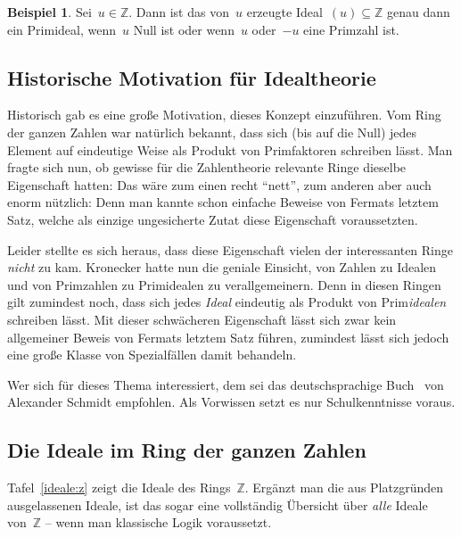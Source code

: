 \documentclass[a4paper,ngerman,12pt]{scrartcl}
\theoremstyle{definition}
\newtheorem{bsp}[defn]{Beispiel}
\theoremstyle{plain}
\theoremstyle{remark}
\newcommand{\ZZ}{\mathbb{Z}}
\renewcommand{\_}{\mathpunct{.}\,}
\newcommand{\?}{\,{:}\,}
\begin{document}
\begin{bsp}Sei~$u \in \ZZ$. Dann ist das von~$u$ erzeugte Ideal~$(u) \subseteq
\ZZ$ genau dann ein Primideal, wenn~$u$ Null ist oder wenn~$u$ oder~$-u$ eine
Primzahl ist.\end{bsp}


\subsection{Historische Motivation für Idealtheorie}

Historisch gab es eine große Motivation, dieses Konzept einzuführen. Vom Ring
der ganzen Zahlen war natürlich bekannt, dass sich (bis auf die Null) jedes
Element auf eindeutige Weise als Produkt von Primfaktoren schreiben lässt. Man
fragte sich nun, ob gewisse für die Zahlentheorie relevante Ringe dieselbe
Eigenschaft hatten: Das wäre zum einen recht "`nett"', zum anderen aber auch
enorm nützlich: Denn man kannte schon einfache Beweise von Fermats letztem
Satz, welche als einzige ungesicherte Zutat diese Eigenschaft voraussetzten.

Leider stellte es sich heraus, dass diese Eigenschaft vielen der interessanten
Ringe \emph{nicht} zu kam. Kronecker hatte nun die geniale Einsicht, von
Zahlen zu Idealen und von Primzahlen zu Primidealen zu verallgemeinern. Denn in
diesen Ringen gilt zumindest noch, dass sich jedes \emph{Ideal} eindeutig als
Produkt von Prim\emph{idealen} schreiben lässt. Mit dieser schwächeren Eigenschaft
lässt sich zwar kein allgemeiner Beweis von Fermats letztem Satz führen,
zumindest lässt sich jedoch eine große Klasse von Spezialfällen damit
behandeln.

Wer sich für dieses Thema interessiert, dem sei das deutschsprachige
Buch~\cite{schmidt:zahlentheorie} von Alexander Schmidt empfohlen. Als Vorwissen
setzt es nur Schulkenntnisse voraus.


\subsection{Die Ideale im Ring der ganzen Zahlen}

Tafel~\ref{ideale:z} zeigt die Ideale des Rings~$\ZZ$.
Ergänzt man die aus Platzgründen ausgelassenen Ideale, ist das
sogar eine vollständig Übersicht über \emph{alle} Ideale von~$\ZZ$ --
wenn man klassische Logik voraussetzt.
\end{document}
